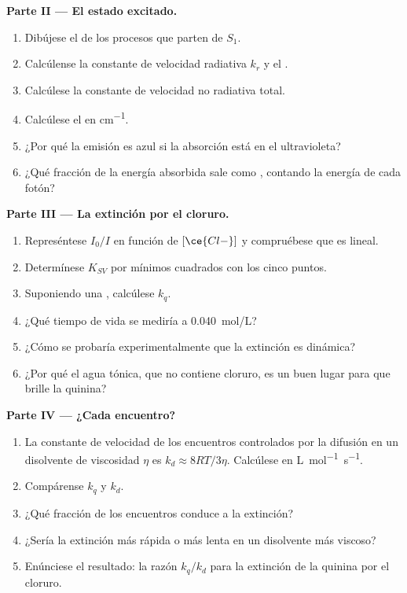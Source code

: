 \begin{problem}
\medskip\noindent\textbf{Parte II --- El estado excitado.}
\begin{enumerate}[resume]
  \item Dibújese el  de los procesos que parten de $S_1$.
  \item Calcúlense la constante de velocidad radiativa $k_r$ y el .
  \item Calcúlese la constante de velocidad no radiativa total.
  \item Calcúlese el  en \unit{cm^{-1}}.
  \item ¿Por qué la emisión es azul si la absorción está en el ultravioleta?
  \item ¿Qué fracción de la energía absorbida sale como , contando
        la energía de cada fotón?
\end{enumerate}

\medskip\noindent\textbf{Parte III --- La extinción por el cloruro.}
\begin{enumerate}[resume]
  \item Represéntese $I_0/I$ en función de $[\ce{Cl-}]$ y compruébese que es lineal.
  \item Determínese $K_{SV}$ por mínimos cuadrados con los cinco puntos.
  \item Suponiendo una , calcúlese $k_q$.
  \item ¿Qué tiempo de vida se mediría a \qty{0.040}{mol/L}?
  \item ¿Cómo se probaría experimentalmente que la extinción es dinámica?
  \item ¿Por qué el agua tónica, que no contiene cloruro, es un buen lugar para que
        brille la quinina?
\end{enumerate}

\medskip\noindent\textbf{Parte IV --- ¿Cada encuentro?}
\begin{enumerate}[resume]
  \item La constante de velocidad de los encuentros controlados por la difusión en un disolvente de
        viscosidad $\eta$ es $k_d \approx 8RT/3\eta$. Calcúlese en \unit{L.mol^{-1}.s^{-1}}.
  \item Compárense $k_q$ y $k_d$.
  \item ¿Qué fracción de los encuentros conduce a la extinción?
  \item ¿Sería la extinción más rápida o más lenta en un disolvente más viscoso?
  \item Enúnciese el resultado: la razón $k_q/k_d$ para la extinción de la quinina por el
        cloruro.
\end{enumerate}
\end{problem}
